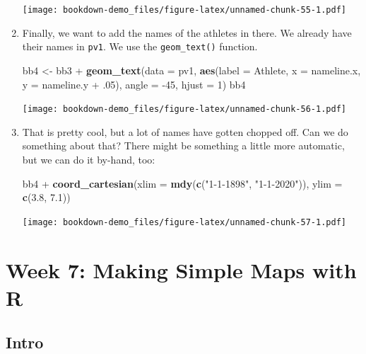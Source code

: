 \documentclass[]{book}
\newenvironment{Shaded}{\begin{snugshade}}{\end{snugshade}}
\newcommand{\KeywordTok}[1]{\textcolor[rgb]{0.13,0.29,0.53}{\textbf{{#1}}}}
\newcommand{\DataTypeTok}[1]{\textcolor[rgb]{0.13,0.29,0.53}{{#1}}}
\newcommand{\DecValTok}[1]{\textcolor[rgb]{0.00,0.00,0.81}{{#1}}}
\newcommand{\FloatTok}[1]{\textcolor[rgb]{0.00,0.00,0.81}{{#1}}}
\newcommand{\StringTok}[1]{\textcolor[rgb]{0.31,0.60,0.02}{{#1}}}
\newcommand{\NormalTok}[1]{{#1}}
\theoremstyle{definition}
\theoremstyle{definition}
\theoremstyle{remark}
\begin{document}
\begin{enumerate}
  \texttt{[image: bookdown-demo\_files/figure-latex/unnamed-chunk-55-1.pdf]}
\item
  Finally, we want to add the names of the athletes in there. We already
  have their names in \texttt{pv1}. We use the \texttt{geom\_text()}
  function.

\begin{Shaded}
\begin{Highlighting}[]
\NormalTok{bb4 <-}\StringTok{ }\NormalTok{bb3 +}\StringTok{ }\KeywordTok{geom_text}\NormalTok{(}\DataTypeTok{data =} \NormalTok{pv1, }
                       \KeywordTok{aes}\NormalTok{(}\DataTypeTok{label =} \NormalTok{Athlete, }
                           \DataTypeTok{x =} \NormalTok{nameline.x, }
                           \DataTypeTok{y =} \NormalTok{nameline.y +}\StringTok{ }\NormalTok{.}\DecValTok{05}\NormalTok{), }
                       \DataTypeTok{angle =} \NormalTok{-}\DecValTok{45}\NormalTok{, }\DataTypeTok{hjust =} \DecValTok{1}\NormalTok{)}
\NormalTok{bb4}
\end{Highlighting}
\end{Shaded}

  \texttt{[image: bookdown-demo\_files/figure-latex/unnamed-chunk-56-1.pdf]}
\item
  That is pretty cool, but a lot of names have gotten chopped off. Can
  we do something about that? There might be something a little more
  automatic, but we can do it by-hand, too:

\begin{Shaded}
\begin{Highlighting}[]
\NormalTok{bb4 +}\StringTok{ }\KeywordTok{coord_cartesian}\NormalTok{(}\DataTypeTok{xlim =} \KeywordTok{mdy}\NormalTok{(}\KeywordTok{c}\NormalTok{(}\StringTok{"1-1-1898"}\NormalTok{, }\StringTok{"1-1-2020"}\NormalTok{)), }\DataTypeTok{ylim =} \KeywordTok{c}\NormalTok{(}\FloatTok{3.8}\NormalTok{, }\FloatTok{7.1}\NormalTok{))}
\end{Highlighting}
\end{Shaded}

  \texttt{[image: bookdown-demo\_files/figure-latex/unnamed-chunk-57-1.pdf]}
\end{enumerate}

\chapter{Week 7: Making Simple Maps with R}\label{map-making-in-R}

\section{Intro}\label{map-making-intro}
\end{document}
